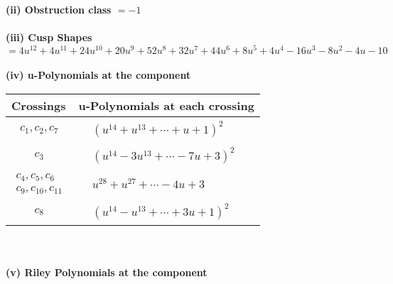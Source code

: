 \documentclass[1p]{elsarticle_modified}
\theoremstyle{definition}
\begin{document}
\flushleft \textbf{(ii) Obstruction class $= -1$}\\~\\
\flushleft \textbf{(iii) Cusp Shapes $= 4 u^{12}+4 u^{11}+24 u^{10}+20 u^9+52 u^8+32 u^7+44 u^6+8 u^5+4 u^4-16 u^3-8 u^2-4 u-10$}\\~\\
\newpage\renewcommand{\arraystretch}{1}
\flushleft \textbf{(iv) u-Polynomials at the component}\newline \\
\begin{tabular}{m{50pt}|m{274pt}}
Crossings & \hspace{64pt}u-Polynomials at each crossing \\
\hline $$\begin{aligned}c_{1},c_{2},c_{7}\end{aligned}$$&$\begin{aligned}
&(u^{14}+u^{13}+\cdots+u+1)^{2}
\end{aligned}$\\
\hline $$\begin{aligned}c_{3}\end{aligned}$$&$\begin{aligned}
&(u^{14}-3 u^{13}+\cdots-7 u+3)^{2}
\end{aligned}$\\
\hline $$\begin{aligned}c_{4},c_{5},c_{6}\\c_{9},c_{10},c_{11}\end{aligned}$$&$\begin{aligned}
&u^{28}+u^{27}+\cdots-4 u+3
\end{aligned}$\\
\hline $$\begin{aligned}c_{8}\end{aligned}$$&$\begin{aligned}
&(u^{14}- u^{13}+\cdots+3 u+1)^{2}
\end{aligned}$\\
\hline
\end{tabular}\\~\\
\newpage\renewcommand{\arraystretch}{1}
\flushleft \textbf{(v) Riley Polynomials at the component}\newline \\
\end{document}
